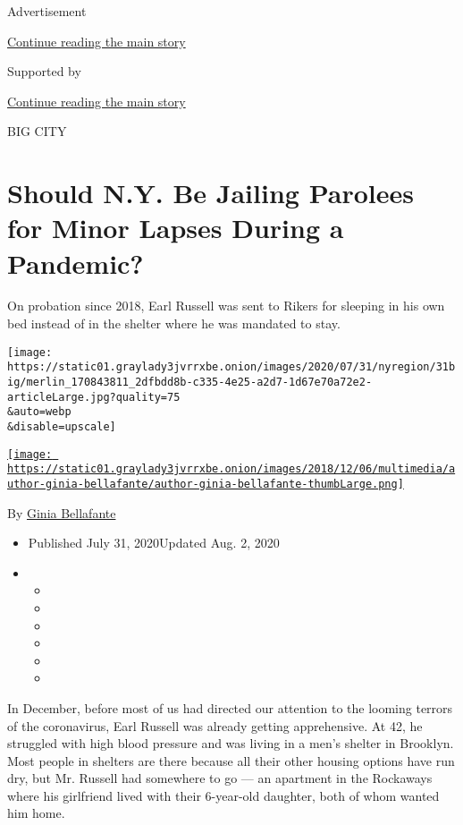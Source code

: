 Advertisement

\protect\hyperlink{after-top}{Continue reading the main story}

Supported by

\protect\hyperlink{after-sponsor}{Continue reading the main story}

BIG CITY

\hypertarget{should-ny-be-jailing-parolees-for-minor-lapses-during-a-pandemic}{%
\section{Should N.Y. Be Jailing Parolees for Minor Lapses During a
Pandemic?}\label{should-ny-be-jailing-parolees-for-minor-lapses-during-a-pandemic}}

On probation since 2018, Earl Russell was sent to Rikers for sleeping in
his own bed instead of in the shelter where he was mandated to stay.

\texttt{[image: https://static01.graylady3jvrrxbe.onion/images/2020/07/31/nyregion/31big/merlin\_170843811\_2dfbdd8b-c335-4e25-a2d7-1d67e70a72e2-articleLarge.jpg?quality=75\\\&auto=webp\\\&disable=upscale]}

\href{https://www.nytimes3xbfgragh.onion/by/ginia-bellafante}{\texttt{[image: https://static01.graylady3jvrrxbe.onion/images/2018/12/06/multimedia/author-ginia-bellafante/author-ginia-bellafante-thumbLarge.png]}}

By \href{https://www.nytimes3xbfgragh.onion/by/ginia-bellafante}{Ginia
Bellafante}

\begin{itemize}
\item
  Published July 31, 2020Updated Aug. 2, 2020
\item
  \begin{itemize}
  \item
  \item
  \item
  \item
  \item
  \item
  \end{itemize}
\end{itemize}

In December, before most of us had directed our attention to the looming
terrors of the coronavirus, Earl Russell was already getting
apprehensive. At 42, he struggled with high blood pressure and was
living in a men's shelter in Brooklyn. Most people in shelters are there
because all their other housing options have run dry, but Mr. Russell
had somewhere to go --- an apartment in the Rockaways where his
girlfriend lived with their 6-year-old daughter, both of whom wanted him
home.

